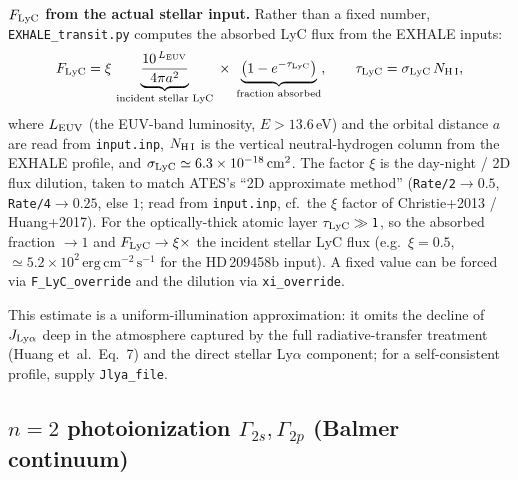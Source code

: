 \documentclass[english,a4paper]{my_memo}
\begin{document}
\textbf{$F_{\rm LyC}$ from the actual stellar input.} Rather than a fixed
number, \texttt{EXHALE\_transit.py} computes the absorbed LyC flux from the EXHALE
inputs:
\[
  F_{\rm LyC} = \xi\,
  \underbrace{\frac{10^{\,L_{\rm EUV}}}{4\pi a^2}}_{\text{incident stellar LyC}}
  \;\times\;\underbrace{\bigl(1-e^{-\tau_{\rm LyC}}\bigr)}_{\text{fraction absorbed}},
  \qquad
  \tau_{\rm LyC} = \sigma_{\rm LyC}\,N_{\rm H\,I},
\]
where $L_{\rm EUV}$ (the EUV-band luminosity, $E>13.6$\,eV) and the
orbital distance $a$ are read from \texttt{input.inp}, $N_{\rm H\,I}$ is
the vertical neutral-hydrogen column from the EXHALE profile, and
$\sigma_{\rm LyC}\simeq6.3\times10^{-18}\,\mathrm{cm^2}$. The factor
$\xi$ is the day-night / 2D flux dilution, taken to match ATES's ``2D
approximate method'' (\texttt{Rate/2}$\to0.5$, \texttt{Rate/4}$\to0.25$,
else $1$; read from \texttt{input.inp}, cf.\ the $\xi$ factor of
Christie+2013 / Huang+2017). For the optically-thick atomic layer
$\tau_{\rm LyC}\gg1$, so the absorbed fraction $\to1$ and
$F_{\rm LyC}\to\xi\times$ the incident stellar LyC flux (e.g.\
$\xi=0.5$, $\simeq5.2\times10^{2}\,\mathrm{erg\,cm^{-2}\,s^{-1}}$ for the
HD\,209458b input). A fixed value can be forced via
\texttt{F\_LyC\_override} and the dilution via \texttt{xi\_override}.

This estimate is a uniform-illumination approximation: it omits the
decline of $J_{\rm Ly\alpha}$ deep in the atmosphere captured by the full
radiative-transfer treatment (Huang et~al.\ Eq.~7) and the direct stellar
Ly$\alpha$ component; for a self-consistent profile, supply
\texttt{Jlya\_file}.

\subsection{$n=2$ photoionization $\Gamma_{2s},\Gamma_{2p}$ (Balmer continuum)}
\label{sec:gamma2}
\end{document}
